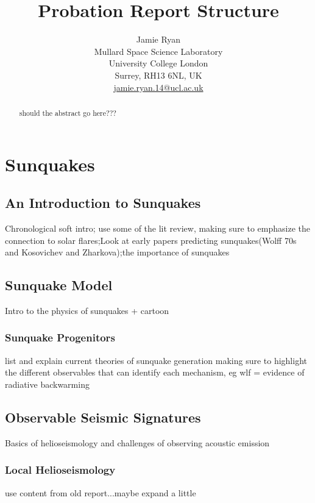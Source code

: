 \documentclass[10pt]{article}
\title{Probation Report Structure}
\author{Jamie Ryan \\ 
Mullard Space Science Laboratory \\
University College London \\
Surrey, RH13 6NL, UK\\
\href{mailto:jamie.ryan.14@ucl.ac.uk}{jamie.ryan.14@ucl.ac.uk}
\date{}}
\begin{document}
\maketitle


\begin{abstract}
should the abstract go here???
\end{abstract}

\section{Sunquakes}
\subsection{An Introduction to Sunquakes}
Chronological soft intro; use some of the lit review,
making sure to emphasize the connection to solar flares;Look at early papers predicting sunquakes(Wolff 70s and Kosovichev and Zharkova);the importance of sunquakes
\subsection{Sunquake Model}
Intro to the physics of sunquakes + cartoon
\subsubsection{Sunquake Progenitors}
list and explain current theories of sunquake generation
making sure to highlight the different observables that can identify each mechanism, eg wlf = evidence of radiative backwarming  
\subsection{Observable Seismic Signatures}
Basics of helioseismology and challenges of observing acoustic emission
\subsubsection{Local Helioseismology}
use content from old report...maybe expand a little

\end{document}
